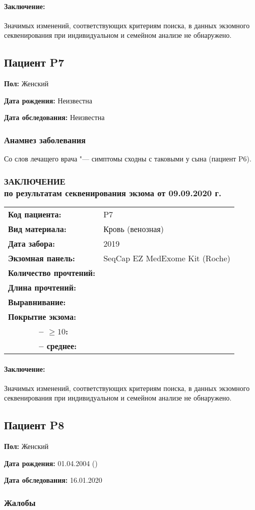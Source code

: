\documentclass[a4paper,14pt]{extarticle}
\newcommand{\reportgen}[9]{
\begin{tabular}{ >{\bfseries}p{0.35\textwidth} l }
Код пациента: & #1 \\
Вид материала: & #2 \\
Дата забора: & #3 \\
Экзомная панель: & #4 \\
Количество прочтений: & \numprint[\mln]{#5} \\
Длина прочтений: & \numprint[bp]{#6} \\
Выравнивание: & \numprint[\%]{#7} \\
Покрытие экзома: & ~ \\
~~~~~~ -- $\geqslant10$: & \numprint[\%]{#8} \\
~~~~~~ -- среднее: & \numprint[прочтений/позицию]{#9} \\
\end{tabular}}
\newcommand{\mln}{млн}
\begin{document}
\paragraph{Заключение:} Значимых изменений, соответствующих критериям поиска, в данных экзомного секвенирования при индивидуальном и семейном анализе не обнаружено.

\newpage
\subsection*{Пациент P7}

\textbf{Пол:} Женский

\textbf{Дата рождения:} Неизвестна

\textbf{Дата обследования:} Неизвестна

\subsubsection*{Анамнез заболевания}

Со слов лечащего врача "--- симптомы сходны с таковыми у сына (пациент P6).

\newpage
\subsubsection*{ЗАКЛЮЧЕНИЕ\\по результатам секвенирования экзома от 09.09.2020 г.}

\reportgen{P7}{Кровь (венозная)}{2019}{SeqCap EZ MedExome Kit (Roche)}{146.2}{150}{99.82}{81.84}{15}

\paragraph{Заключение:} Значимых изменений, соответствующих критериям поиска, в данных экзомного секвенирования при индивидуальном и семейном анализе не обнаружено.

\newpage
\subsection*{Пациент P8}

\textbf{Пол:} Женский

\textbf{Дата рождения:} 01.04.2004 ()

\textbf{Дата обследования:} 16.01.2020

\subsubsection*{Жалобы}
\end{document}

